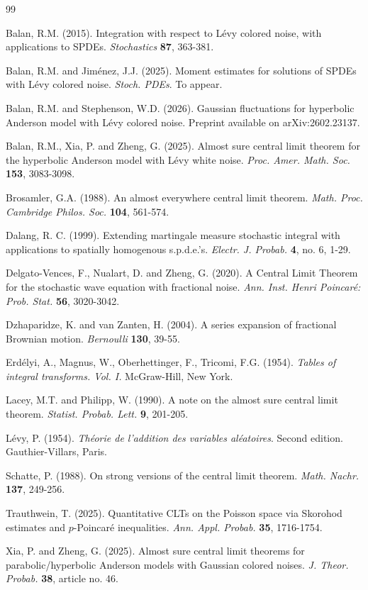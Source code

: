 \documentclass[12pt]{article}
\begin{document}
\begin{thebibliography}{99}

 Balan, R.M. (2015). Integration with respect to L\'evy colored noise, with applications to SPDEs. {\em Stochastics} {\bf 87}, 363-381.
    

 Balan, R.M. and Jim\'enez, J.J. (2025). Moment estimates for solutions of SPDEs with L\'evy colored noise. {\em Stoch. PDEs}. To appear. 

 Balan, R.M. and Stephenson, W.D. (2026). Gaussian fluctuations for hyperbolic Anderson model with L\'evy colored noise. Preprint available on arXiv:2602.23137.
    
 Balan, R.M., Xia, P. and Zheng, G. (2025). Almost sure central limit theorem for the hyperbolic Anderson model with L\'evy white noise. {\em Proc. Amer. Math. Soc.} {\bf 153}, 3083-3098. 
 
 Brosamler, G.A. (1988). An almost everywhere central limit theorem.
{\em Math. Proc. Cambridge Philos. Soc.} {\bf 104}, 561-574.

   
 Dalang, R. C. (1999). Extending martingale
measure stochastic integral with applications to spatially
homogenous s.p.d.e.'s. {\em Electr. J. Probab.} {\bf 4}, no. 6,
1-29. %

 Delgato-Vences, F., Nualart, D. and Zheng, G. (2020). A Central Limit Theorem for the stochastic wave equation with fractional noise. {\em Ann. Inst. Henri Poincar\'e: Prob. Stat.} {\bf 56}, 3020-3042.

 Dzhaparidze, K. and van Zanten, H. (2004). A series expansion of fractional Brownian motion. {\em Bernoulli} {\bf 130}, 39-55.

 Erd\'elyi, A., Magnus, W., Oberhettinger, F., Tricomi, F.G. (1954). {\em Tables of integral transforms. Vol. I.} McGraw-Hill, New York.
    
 Lacey, M.T. and Philipp, W. (1990).
A note on the almost sure central limit theorem. {\em Statist. Probab. Lett.} {\bf 9}, 201-205.

    
 L\'evy, P. (1954). {\em Th\'eorie de l'addition des variables al\'eatoires}. Second edition. Gauthier-Villars, Paris.

 Schatte, P. (1988). On strong versions of the central limit theorem.
{\em Math. Nachr.} {\bf 137}, 249-256.


    
 Trauthwein, T. (2025). Quantitative CLTs on the Poisson space via Skorohod estimates and $p$-Poincar\'e inequalities. {\em Ann. Appl. Probab.} {\bf 35}, 1716-1754.
    
 Xia, P. and Zheng, G. (2025). Almost sure central limit theorems for parabolic/hyperbolic Anderson models with Gaussian colored noises. {\em J. Theor. Probab.} {\bf 38}, article no. 46.

\end{thebibliography}
\end{document}
